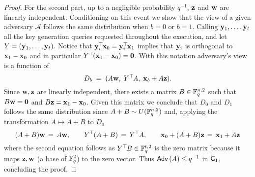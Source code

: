 \begin{proof}
	For the second part, up to a negligible probability $q^{-1}$, $\mathbf{z}$ and $\mathbf{w}$ are linearly independent.
	Conditioning on this event we show that the view of a given adversary $\mathcal{A}$ follows the same distribution when $b = 0$ or $b = 1$.
	Calling $\mathbf{y}_1, \ldots, \mathbf{y}_t$ all the key generation queries requested throughout the execution, and let $Y = (\mathbf{y}_1, \ldots, \mathbf{y}_t)$.
	Notice that $\mathbf{y}_i^\top\hspace{-.1em} \mathbf{x}_0 = \mathbf{y}_i^\top\hspace{-.1em} \mathbf{x}_1$ implies that $\mathbf{y}_i$ is orthogonal to $\mathbf{x}_1 - \mathbf{x}_0$ and in particular $Y^\top\hspace{-.1em}(\mathbf{x}_1 - \mathbf{x}_0) = \mathbf{0}$.
	With this notation adversary's view is a function of 
	\[
		D_b \; = \; (A\mathbf{w}, \; Y^\top\hspace{-.1em} A, \; \mathbf{x}_b + A \mathbf{z}).
	\]
	Since $\mathbf{w}, \mathbf{z}$ are linearly independent, there exists a matrix $B \in \mathbb{F}_q^{n, 2}$ such that $B \mathbf{w} = \mathbf{0}$ and $B \mathbf{z} = \mathbf{x}_1 - \mathbf{x}_0$.
	Given this matrix we conclude that $D_0$ and $D_1$ follows the same distribution since $A + B \sim U(\mathbb{F}_q^{n, 2})$ and, applying the transformation $A \mapsto A + B$ to $D_0$
	\[
		(A + B) \mathbf{w} 
			\, = \, 
		A \mathbf{w},
			\qquad
		Y^\top\hspace{-.1em}(A + B)
			\, = \,
		Y^\top\hspace{-.1em} A,
			\qquad
		\mathbf{x}_0 + (A + B) \mathbf{z}
			\, = \,
		\mathbf{x}_1 + A \mathbf{z}
	\]
	where the second equation follows as $Y^\top\hspace{-.1em} B \in \mathbb{F}_q^{t, 2}$ is the zero matrix because it maps $\mathbf{z}, \mathbf{w}$ (a base of $\mathbb{F}_q^2$) to the zero vector.
	Thus $\mathsf{Adv}\left(A\right) \leq q^{-1}$ in $\mathsf{G}_1$, concluding the proof.
\end{proof}
